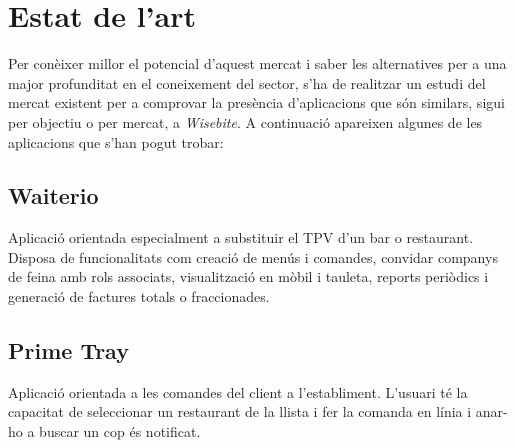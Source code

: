 
\chapter{Estat de l'art} %

\label{Chapter2} %

Per conèixer millor el potencial d'aquest mercat i saber les alternatives per a una major profunditat en el coneixement del sector, s'ha de realitzar un estudi del mercat existent per a comprovar la presència d'aplicacions que són similars, sigui per objectiu o per mercat, a \textit{Wisebite}. A continuació apareixen algunes de les aplicacions que s'han pogut trobar:


\section{Waiterio}

Aplicació\cite{waiterio} orientada especialment a substituir el TPV d'un bar o restaurant. Disposa de funcionalitats com creació de menús i comandes, convidar companys de feina amb rols associats, visualització en mòbil i tauleta, reports periòdics i generació de factures totals o fraccionades.


\section{Prime Tray}

Aplicació\cite{primetray} orientada a les comandes del client a l'establiment. L'usuari té la capacitat de seleccionar un restaurant de la llista i fer la comanda en línia i anar-ho a buscar un cop és notificat.


